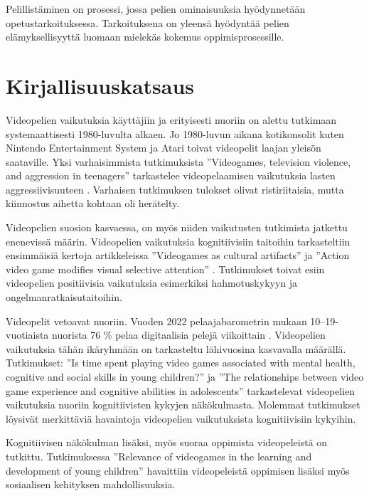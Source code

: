 \documentclass[utf8,bachelor]{gradu3}
\begin{document}
Pelillistäminen on prosessi, jossa pelien ominaisuuksia hyödynnetään opetustarkoituksessa. Tarkoituksena on yleensä hyödyntää pelien elämyksellisyyttä luomaan mielekäs kokemus oppimisprosessille.

\section{Kirjallisuuskatsaus}

Videopelien vaikutuksia käyttäjiin ja erityisesti nuoriin on alettu tutkimaan systemaattisesti 1980-luvulta alkaen. Jo 1980-luvun aikana kotikonsolit kuten Nintendo Entertainment System ja Atari toivat videopelit laajan yleisön saataville. Yksi varhaisimmista tutkimuksista ''Videogames, television violence, and aggression in teenagers'' tarkastelee videopelaamisen vaikutuksia lasten aggressiivisuuteen \parencite{dominick1984videogames}. Varhaisen tutkimuksen tulokset olivat ristiriitaisia, mutta kiinnostus aihetta kohtaan oli herätelty.  

Videopelien suosion kasvaessa, on myös niiden vaikutusten tutkimista jatkettu enenevissä määrin. Videopelien vaikutuksia kognitiivisiin taitoihin tarkasteltiin ensimmäisiä kertoja artikkeleissa ''Videogames as cultural artifacts'' \parencite{greenfield1994video} ja ''Action video game modifies visual selective attention'' \parencite{green2003action}. Tutkimukset toivat esiin videopelien positiivisia vaikutuksia esimerkiksi hahmotuskykyyn ja ongelmanratkaisutaitoihin.  

Videopelit vetoavat nuoriin. Vuoden 2022 pelaajabarometrin mukaan 10–19-vuotiaista nuorista 76 \% pelaa digitaalisia pelejä viikoittain \parencite{kinnunen2022pelaajabarometri}. Videopelien vaikutuksia tähän ikäryhmään on tarkasteltu lähivuosina kasvavalla määrällä. Tutkimukset: ''Is time spent playing video games associated with mental health, cognitive and social skills in young children?'' \parencite{kovess2016time} ja ''The relationships between video game experience and cognitive abilities in adolescents'' \parencite{ozccetin2019relationships} tarkastelevat videopelien vaikutuksia nuoriin kognitiivisten kykyjen näkökulmasta. Molemmat tutkimukset löysivät merkittäviä havaintoja videopelien vaikutuksista kognitiivisiin kykyihin.  

Kognitiivisen näkökulman lisäksi, myös suoraa oppimista videopeleistä on tutkittu. Tutkimuksessa ''Relevance of videogames in the learning and development of young children'' \parencite{zhao2015relevance} havaittiin videopeleistä oppimisen lisäksi myös sosiaalisen kehityksen mahdollisuuksia.  
\end{document}
